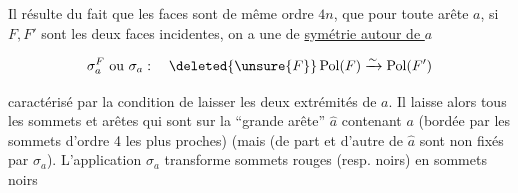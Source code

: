
Il résulte du fait que  les faces sont de même ordre $4n$, que pour  toute arête $a$, si $F,F'$ sont les deux faces incidentes, on a une  de \uline{symétrie autour de $a$}


\[ \sigma_a^F\text{ ou }\sigma_a:\quad \deleted{\unsure{F}}\operatorname{Pol}(F)\xrightarrow{\sim}\operatorname{Pol}(F') \]

caractérisé par la condition de laisser   les deux extrémités de $a$. Il laisse alors    tous les sommets et arêtes qui sont sur la ``grande arête'' $\widehat a$ contenant $a$ (bordée par les sommets d'ordre 4 les plus proches) (mais   (de part et d'autre de $\widehat a$ sont non fixés par $\sigma_a$). L'application $\sigma_a$ transforme sommets rouges (resp. noirs) en sommets noirs

